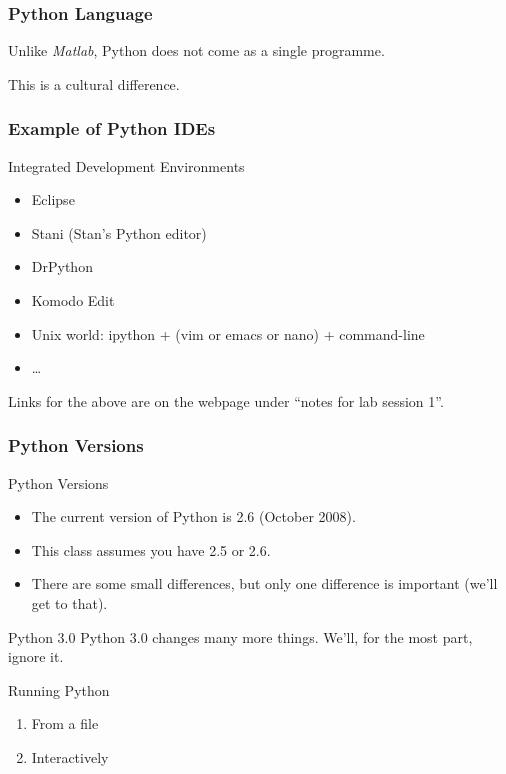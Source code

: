 \begin{frame}[fragile]
\frametitle{Python Language}

Unlike \textit{Matlab}, Python does not come as a single programme.

This is a cultural difference.

\end{frame}

\begin{frame}[fragile]
\frametitle{Example of Python IDEs}

\begin{block}{Integrated Development Environments}
\begin{itemize}
\item Eclipse
\item Stani (Stan's Python editor)
\item DrPython
\item Komodo Edit
\item Unix world: ipython + (vim or emacs or nano) + command-line
\item \ldots
\end{itemize}
\end{block}

Links for the above are on the webpage under ``notes for lab session 1''.
\end{frame}

\begin{frame}
\frametitle{Python Versions}

\begin{block}{Python Versions}
\begin{itemize}
\item The current version of Python is \alert{2.6} (October 2008).
\item This class assumes you have 2.5 or 2.6.
\item There are some small differences, but only one difference is important (we'll get to that).
\end{itemize}
\end{block}

\begin{block}{Python 3.0}
Python 3.0 changes many more things. We'll, for the most part, ignore it.
\end{block}
\end{frame}

\begin{frame}[fragile]

\begin{block}{Running Python}
\begin{enumerate}
\item From a file
\item Interactively
\end{enumerate}
\end{block}

\end{frame}

